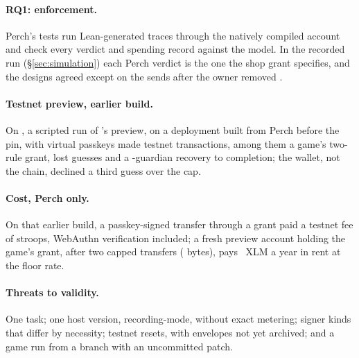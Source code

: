 \paragraph{RQ1: enforcement.} Perch's tests run 
Lean-generated traces through the natively compiled account and check every
verdict and spending record against the model. In the recorded run
(\S\ref{sec:simulation}) each Perch verdict is the one the shop grant
specifies, and the designs agreed except on the 
sends after the owner removed .

\paragraph{Testnet preview, earlier build.} On , a scripted
run of 's preview, on a deployment built from Perch
 before the pin, with virtual passkeys made
 testnet transactions, among them a game's two-rule
grant,  lost guesses and a
-guardian recovery to completion; the wallet,
not the chain, declined a third guess over the cap.

\paragraph{Cost, Perch only.} On that earlier build, a passkey-signed transfer
through a grant paid a testnet fee of  stroops, WebAuthn verification included;
a fresh preview account holding the game's grant, after two capped transfers
( bytes), pays ~XLM a year in rent
at the floor rate.

\paragraph{Threats to validity.} One task; one host version, recording-mode, without
exact metering; signer kinds that differ by necessity; testnet resets, with
envelopes not yet archived; and a game run from a branch with an uncommitted
patch.

